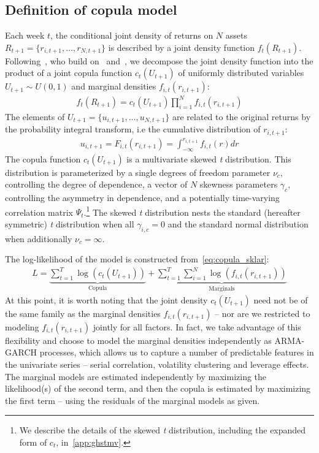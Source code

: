 
\subsection{Definition of copula model} %
\label{sub:definition_of_copula_model}

Each week $t$, the conditional joint density of returns on $N$ assets $R_{t+1} = \{r_{i,t+1},\ldots,r_{N,t+1}\}$ is described by a joint density function $f_t(R_{t+1})$. Following~\textcite{ChristoffersenErrunzaJacobLanglois2012}, who build on~\textcite{Patton2006} and~\textcite{Sklar1959}, we decompose the joint density function into the product of a joint copula function $c_t(U_{t+1})$ of uniformly distributed variables $U_{t+1} \sim U(0, 1)$ and marginal densities $f_{i,t}(r_{i,t+1})$:
\begin{align}
  f_t(R_{t+1}) =
    c_t(U_{t+1}) \prod^N_{i=1} f_{i,t}(r_{i,t+1})
  \label{eq:copula_sklar}
\end{align}
The elements of $U_{t+1} = \{u_{i,t+1},\ldots,u_{N,t+1}\}$ are related to the original returns by the probability integral transform, i.e the cumulative distribution of $r_{i,t+1}$:
\begin{align}
  u_{i,t+1} = F_{i,t}(r_{i,t+1}) = \int_{-\infty}^{r_{i,t+1}} f_{i,t}(r)dr
\end{align}
The copula function $c_t(U_{t+1})$ is a multivariate skewed \emph{t} distribution. This distribution is parameterized by a single degrees of freedom parameter $\nu_c$, controlling the degree of dependence, a vector of $N$ skewness parameters $\gamma_c$, controlling the asymmetry in dependence, and a potentially time-varying correlation matrix $\Psi_{t}$.\footnote{We describe the details of the skewed \emph{t} distribution, including the expanded form of $c_t$, in~\autoref{app:ghstmv}.} The skewed \emph{t} distribution nests the standard (hereafter symmetric) \emph{t} distribution when all $\gamma_{i,c} = 0$ and the standard normal distribution when additionally $\nu_c = \infty$.

The log-likelihood of the model is constructed from~\autoref{eq:copula_sklar}:
\begin{align}
  L =
    \underbrace{\sum_{t=1}^T \log(c_t(U_{t+1}))}_\text{Copula} +
    \underbrace{\sum_{t=1}^T \sum_{i=1}^N \log(f_{i,t}(r_{i,t+1}))}_\text{Marginals}
\end{align}
At this point, it is worth noting that the joint density $c_t(U_{t+1})$ need not be of the same family as the marginal densities $f_{i,t}(r_{i,t+1})$ -- nor are we restricted to modeling $f_{i,t}(r_{i,t+1})$ jointly for all factors. In fact, we take advantage of this flexibility and choose to model the marginal densities independently as ARMA-GARCH processes, which allows us to capture a number of predictable features in the univariate series -- serial correlation, volatility clustering and leverage effects. The marginal models are estimated independently by maximizing the likelihood(s) of the second term, and then the copula is estimated by maximizing the first term -- using the residuals of the marginal models as given.

